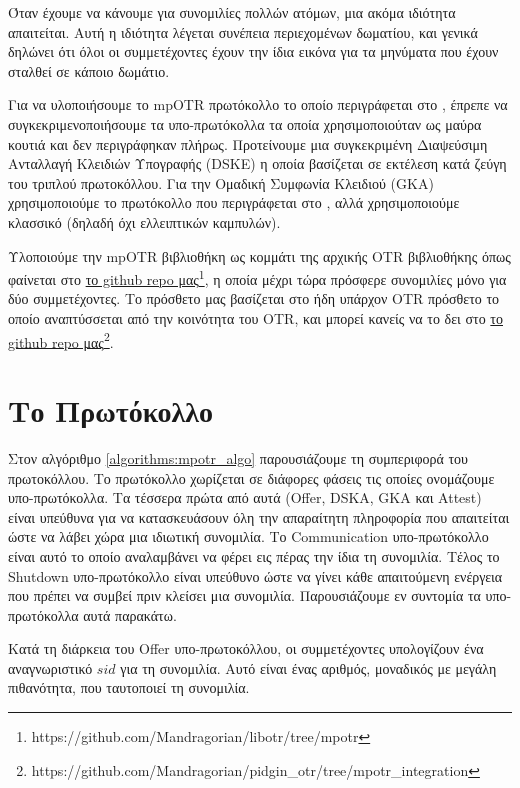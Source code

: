Όταν έχουμε να κάνουμε για συνομιλίες πολλών ατόμων, μια ακόμα ιδιότητα απαιτείται.
Αυτή η ιδιότητα λέγεται συνέπεια περιεχομένων δωματίου, και γενικά δηλώνει ότι όλοι οι συμμετέχοντες έχουν την ίδια εικόνα για τα μηνύματα που έχουν σταλθεί σε κάποιο δωμάτιο.

Για να υλοποιήσουμε το mpOTR πρωτόκολλο το οποίο περιγράφεται στο \cite{mpotr}, έπρεπε να συγκεκριμενοποιήσουμε τα υπο-πρωτόκολλα τα οποία χρησιμοποιούταν ως μαύρα κουτιά και δεν περιγράφηκαν πλήρως.
Προτείνουμε μια συγκεκριμένη Διαψεύσιμη Ανταλλαγή Κλειδιών Υπογραφής (DSKE) η οποία βασίζεται σε εκτέλεση κατά ζεύγη του τριπλού \dhname πρωτοκόλλου.
Για την Ομαδική Συμφωνία Κλειδιού (GKA) χρησιμοποιούμε το πρωτόκολλο που περιγράφεται στο \cite{mpenc}, αλλά χρησιμοποιούμε κλασσικό \dhname (δηλαδή όχι \dhname ελλειπτικών καμπυλών).

Υλοποιούμε την mpOTR βιβλιοθήκη ως κομμάτι της αρχικής OTR βιβλιοθήκης όπως φαίνεται στο \href{https://github.com/Mandragorian/libotr/tree/mpotr}{το github repo μας\footnote{https://github.com/Mandragorian/libotr/tree/mpotr}}, η οποία μέχρι τώρα πρόσφερε συνομιλίες μόνο για δύο συμμετέχοντες.
Το πρόσθετο μας βασίζεται στο ήδη υπάρχον OTR πρόσθετο το οποίο αναπτύσσεται από την κοινότητα του OTR, και μπορεί κανείς να το δει στο \href{https://github.com/Mandragorian/pidgin_otr/tree/mpotr_integration}{το github repo μας\footnote{https://github.com/Mandragorian/pidgin\_otr/tree/mpotr\_integration}}.

\section{Το Πρωτόκολλο}

Στον αλγόριθμο \ref{algorithms:mpotr_algo} παρουσιάζουμε τη συμπεριφορά του πρωτοκόλλου.
Το πρωτόκολλο χωρίζεται σε διάφορες φάσεις τις οποίες ονομάζουμε υπο-πρωτόκολλα.
Τα τέσσερα πρώτα από αυτά (Offer, DSKA, GKA και Attest) είναι υπεύθυνα για να κατασκευάσουν όλη την απαραίτητη πληροφορία που απαιτείται ώστε να λάβει χώρα μια ιδιωτική συνομιλία.
Το Communication υπο-πρωτόκολλο είναι αυτό το οποίο αναλαμβάνει να φέρει εις πέρας την ίδια τη συνομιλία.
Τέλος το Shutdown υπο-πρωτόκολλο είναι υπεύθυνο ώστε να γίνει κάθε απαιτούμενη ενέργεια που πρέπει να συμβεί πριν κλείσει μια συνομιλία.
Παρουσιάζουμε εν συντομία τα υπο-πρωτόκολλα αυτά παρακάτω.

Κατά τη διάρκεια του Offer υπο-πρωτοκόλλου, οι συμμετέχοντες υπολογίζουν ένα αναγνωριστικό $sid$ για τη συνομιλία.
Αυτό είναι ένας αριθμός, μοναδικός με μεγάλη πιθανότητα, που ταυτοποιεί τη συνομιλία.

